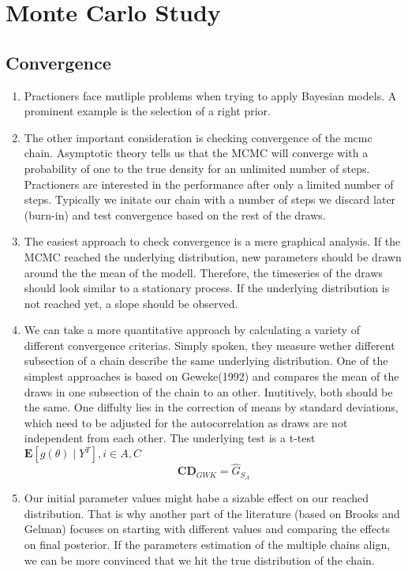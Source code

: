 \section{Monte Carlo Study}

\subsection{Convergence}
\begin{enumerate}
 \item Practioners face mutliple problems when trying to apply Bayesian models. A prominent example is the selection of a right prior.

\item The other important consideration is checking convergence of the mcmc chain. Asymptotic theory tells us that the MCMC will converge with a probability of one to the true density for an unlimited number of steps. Practioners are interested in the performance after only a limited number of steps. 
Typically we initate our chain with a number of steps we discard later (burn-in) and test convergence based on the rest of the draws.
\item  
The easiest approach to check convergence is a mere graphical analysis. If the MCMC reached the underlying distribution, new parameters should be drawn around the the mean of the modell. Therefore, the timeseries of the draws should look similar to a stationary process. If the underlying distribution is not reached yet, a slope should be observed. 

\item We can take a more quantitative  approach by calculating a variety of different convergence criterias. Simply spoken, they measure wether different subsection of a chain describe the same underlying distribution. One of the simplest approaches is based on Geweke(1992) and compares the mean of the draws in one subsection of the chain to an other. Inutitively, both should be the same. One diffulty lies in the correction of means by standard deviations, which need to be adjusted for the autocorrelation as draws are not independent from each other. The underlying test is a t-test $\mathbf{E}\left[g(\theta) \mid Y^T\right], i \in {A,C}$
$$\mathbf{CD}_{GW K}=\hat{G}_{S_A}$$


\item Our initial parameter values might habe a sizable effect on our reached distribution. That is why another part of the literature (based on Brooks and Gelman) focuses on starting with different values and comparing the effects on final posterior. If the parameters estimation of the multiple chains align, we can be more convinced that we hit the true distribution of the chain. 


\end{enumerate}
